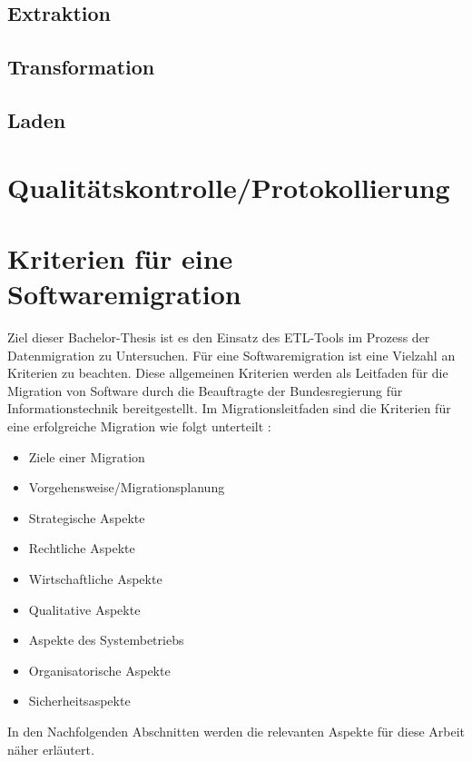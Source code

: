 \subsection{Extraktion}

\subsection{Transformation}
\subsection{Laden}
 

\section{Qualitätskontrolle/Protokollierung}

\section{Kriterien für eine Softwaremigration}
Ziel dieser Bachelor-Thesis ist es den Einsatz des ETL-Tools im Prozess der Datenmigration zu Untersuchen. Für eine Softwaremigration ist eine Vielzahl an Kriterien zu beachten. Diese allgemeinen Kriterien werden als Leitfaden für die Migration von Software durch die Beauftragte der Bundesregierung für Informationstechnik bereitgestellt. Im Migrationsleitfaden sind die Kriterien für eine erfolgreiche Migration wie folgt unterteilt \cite{BUND12}:
\begin{itemize}
  \item Ziele einer Migration
  \item Vorgehensweise/Migrationsplanung
  \item Strategische Aspekte
  \item Rechtliche Aspekte
  \item Wirtschaftliche Aspekte
  \item Qualitative Aspekte
  \item Aspekte des Systembetriebs
  \item Organisatorische Aspekte
  \item Sicherheitsaspekte
\end{itemize}
In den Nachfolgenden Abschnitten werden die relevanten Aspekte für diese Arbeit näher erläutert.
